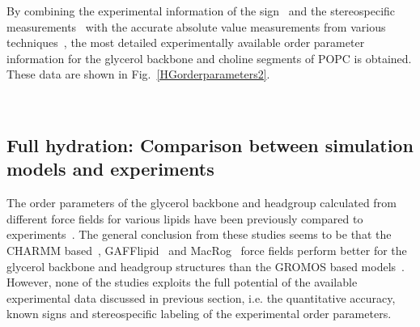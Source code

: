 \documentclass[pre,aps,floatfix,authordate1-4,twocolumn]{revtex4-1}
\begin{document}
By combining the experimental information of the sign~\cite{hong95a,hong95b,gross97} and the stereospecific
measurements~\cite{gally81} with the accurate absolute value measurements from various techniques~\cite{gally75,akutsu81,gross97,dvinskikh05a,ferreira13},
the most detailed experimentally available order parameter information for the glycerol backbone and choline segments of POPC is obtained.
These data are shown in Fig.~\ref{HGorderparameters2}.
\begin{figure*}[]
  \centering
   \\
  \caption{\label{HGorderparameters2}
  Order parameteres from simulations with Berger-POPC-07, CHARMM36, GAFFlipid and MacRog force fields together with experimental values for POPC glycerol and choline groups.
  The magnitudes for experimental order parameters are taken from Ferreira et al.~\cite{ferreira13}, the signs are based on the measurements by Hong et al.~\cite{hong95a,hong95b} 
  and Gross et al.~\cite{gross97}, and the R/S labeling is based in the measurements by Gally et al.~\cite{gally81}.
} 
\end{figure*}

\subsection{Full hydration: Comparison between simulation models and experiments}

The order parameters of the glycerol backbone and headgroup calculated from different force fields for various lipids have been 
previously compared to experiments~\cite{shinoda97,hogberg08,castro08,klauda10,kapla12,dickson12,poger12,ferreira13,chowdhary13,maciejewski14}. 
The general conclusion from these studies seems to be that the CHARMM based~\cite{hogberg08,klauda10}, GAFFlipid~\cite{dickson12} and
MacRog~\cite{maciejewski14} force fields perform better for the glycerol backbone and headgroup structures than the GROMOS based models~\cite{castro08,kapla12,poger12,ferreira13}.
However, none of the studies exploits the full potential of the available experimental data discussed in previous section, i.e. the quantitative accuracy, known signs and stereospecific labeling of
the experimental order parameters.
\end{document}
